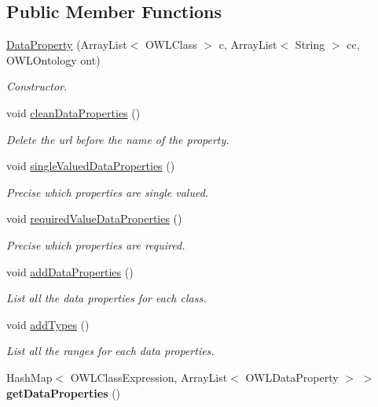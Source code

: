 \subsection*{Public Member Functions}
\begin{DoxyCompactItemize}
\item 
\hyperlink{class_ontology_1_1_data_property_a2b6f27d096d62baa79eaef7b3909dccd}{DataProperty} (ArrayList$<$ OWLClass $>$ c, ArrayList$<$ String $>$ cc, OWLOntology ont)
\begin{DoxyCompactList}\small\item\em Constructor. \end{DoxyCompactList}\item 
\hypertarget{class_ontology_1_1_data_property_a51849b588f7a80bb59fba215a06c54df}{
void \hyperlink{class_ontology_1_1_data_property_a51849b588f7a80bb59fba215a06c54df}{cleanDataProperties} ()}
\label{class_ontology_1_1_data_property_a51849b588f7a80bb59fba215a06c54df}

\begin{DoxyCompactList}\small\item\em Delete the url before the name of the property. \end{DoxyCompactList}\item 
void \hyperlink{class_ontology_1_1_data_property_a5b082464ba431055164a63d976006916}{singleValuedDataProperties} ()
\begin{DoxyCompactList}\small\item\em Precise which properties are single valued. \end{DoxyCompactList}\item 
void \hyperlink{class_ontology_1_1_data_property_a04c8a57a7b625f5075d407540980946e}{requiredValueDataProperties} ()
\begin{DoxyCompactList}\small\item\em Precise which properties are required. \end{DoxyCompactList}\item 
void \hyperlink{class_ontology_1_1_data_property_ab585a75a37b556425a74d5861e761046}{addDataProperties} ()
\begin{DoxyCompactList}\small\item\em List all the data properties for each class. \end{DoxyCompactList}\item 
void \hyperlink{class_ontology_1_1_data_property_a5773fd26f41397dbc83d8f3fcd0ea311}{addTypes} ()
\begin{DoxyCompactList}\small\item\em List all the ranges for each data properties. \end{DoxyCompactList}\item 
\hypertarget{class_ontology_1_1_data_property_a5466224f71a03956a98911e60d8318d2}{
HashMap$<$ OWLClassExpression, ArrayList$<$ OWLDataProperty $>$ $>$ {\bfseries getDataProperties} ()}
\label{class_ontology_1_1_data_property_a5466224f71a03956a98911e60d8318d2}


\end{DoxyCompactItemize}
